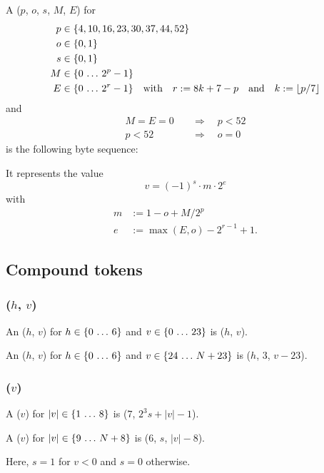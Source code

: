 A ($p$, $o$, $s$, $M$, $E$) for
\begin{align*}
    p & \in \{4, 10, 16, 23, 30, 37, 44, 52\} \\
    o & \in \{0, 1\} \\
    s & \in \{0, 1\} \\
    M & \in \{0 \,\ldots\, 2^p - 1\} \\
    E & \in \{0 \,\ldots\, 2^r - 1\}
        \quad\text{with}\quad r := 8 k + 7 - p
        \quad\text{and}\quad k := \lfloor p / 7 \rfloor
\end{align*}%
and
\begin{align*}
    M = E = 0 \quad & \Rightarrow \quad p < 52 \\
    p < 52 \quad & \Rightarrow \quad o = 0
\end{align*}%
is the following byte sequence:


It represents the value
\begin{equation}
    v = (-1)^s \cdot m \cdot 2^e
\end{equation}
with
\begin{align*}
    m & := 1 - o + M / 2^p \\
    e & := \max(E, o) - 2^{r-1} + 1.
\end{align*}


\subsection{Compound tokens}

\subsubsection{($h$, $v$)}
\hypertarget{sec:def:IntegerToken}{}

An ($h$, $v$) for $h \in \{0 \,\ldots\, 6\}$ and
$v \in \{0 \,\ldots\, 23\}$ is ($h$, $v$).

An ($h$, $v$) for $h \in \{0 \,\ldots\, 6\}$ and
$v \in \{24 \,\ldots\, N + 23\}$
is ($h$, $3$, $v - 23$).


\subsubsection{($v$)}
\hypertarget{sec:def:PowerOfTenToken}{}

A ($v$) for $|v| \in \{1 \,\ldots\, 8\}$ is
($7$, $2^3 s + |v| - 1$).

A ($v$) for $|v| \in \{9 \,\ldots\, N + 8\}$ is
($6$, $s$, $|v| - 8$).

Here, $s = 1$ for $v < 0$ and $s = 0$ otherwise.

